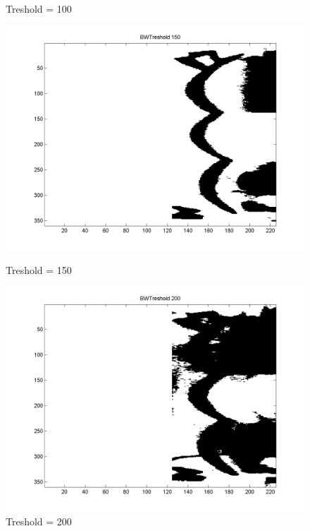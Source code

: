 \documentclass[a4paper]{article}
\begin{document}
\begin{figure}[h!]
\begin{minipage}[b]{0.5\linewidth}
    \caption{Treshold = 100}
    \label{fig:bw100}
  \end{minipage}
\end{figure}
\begin{figure}[h!]
  \begin{minipage}[b]{0.5\linewidth}
    \centering
    \includegraphics[width=\linewidth]{img/BWTreshold_150.png}
    \caption{Treshold = 150}
    \label{fig:bw150}
  \end{minipage}
  \hspace{0.5cm}
  \begin{minipage}[b]{0.5\linewidth}
    \centering
    \includegraphics[width=\linewidth]{img/BWTreshold_200.png}
    \caption{Treshold = 200}
    \label{fig:bw200}
  \end{minipage}
\end{figure}
\end{document}
